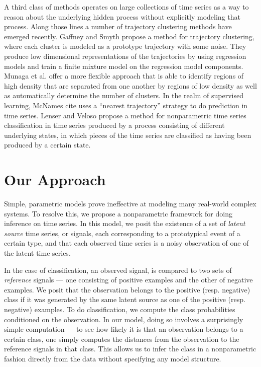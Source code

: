 A third class of methods operates on large collections of time series as a way
to reason about the underlying hidden process without explicitly modeling that
process. Along those lines a number of trajectory clustering methods have
emerged recently. Gaffney and Smyth \cite{people} propose a method for trajectory
clustering, where each cluster is modeled as a prototype trajectory with some
noise. They produce low dimensional representations of the trajectories by using
regression models and train a finite mixture model on the regression model
components. Munaga et al. \cite{people} offer a more flexible approach that is able to
identify regions of high density that are separated from one another by regions
of low density as well as automatically determine the number of clusters. In the
realm of supervised learning, McNames cite{} uses a ``nearest trajectory''
strategy to do prediction in time series. Lenser and Veloso \cite{people} propose a
method for nonparametric time series classification in time series produced by a
process consisting of different underlying states, in which pieces of the time
series are classified as having been produced by a certain state.

\section{Our Approach}
Simple, parametric models prove ineffective at modeling many real-world complex
systems. To resolve this, we propose a nonparametric framework for doing
inference on time series. In this model, we posit the existence of a set of {\em
  latent source} time series, or signals, each corresponding to a prototypical
event of a certain type, and that each observed time series is a noisy
observation of one of the latent time series.

In the case of classification, an observed signal, is compared to two sets of
{\em reference} signals --- one consisting of positive examples and the other of
negative examples. We posit that the observation belongs to the positive
(resp. negative) class if it was generated by the same latent source as one of
the positive (resp. negative) examples. To do classification, we compute the
class probabilities conditioned on the observation. In our model, doing so
involves a surprisingly simple computation --- to see how likely it is that an
observation belongs to a certain class, one simply computes the distances from
the observation to the reference signals in that class. This allows us to infer
the class in a nonparametric fashion directly from the data without specifying
any model structure.

